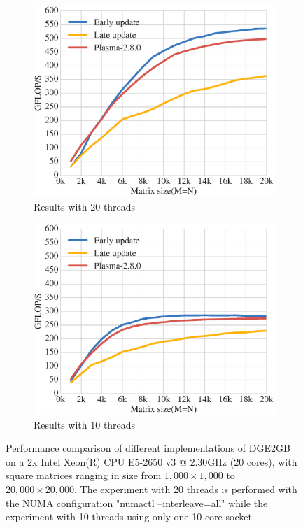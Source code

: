 \begin{figure}[h!]
  \begin{subfigure}[t]{0.5 \textwidth}
    \includegraphics[width=\textwidth]{fig/dge2gb_HASWELL}
    \caption{\label{fig:dge2gb_HASWELL_20}
      Results with 20 threads}
  \end{subfigure}
  \hfill
  \begin{subfigure}[t]{0.5 \textwidth}
    \includegraphics[width=\textwidth]{fig/dge2gb_HASWELL_10}
    \caption{\label{fig:dge2gb_HASWELL_10}
      Results with 10 threads}
  \end{subfigure}
  \caption{Performance comparison of different implementations of
    DGE2GB on a 2x Intel Xeon(R) CPU E5-2650 v3 @ 2.30GHz (20 cores),
    with square matrices ranging in size from $1,000 \times 1,000$ to
    $20,000 \times 20,000$. The experiment with 20 threads is performed
    with the NUMA configuration "numactl --interleave=all" while the
    experiment with 10 threads using only one 10-core socket.}
  \label{fig:dge2gb_HASWELL}
\end{figure}

